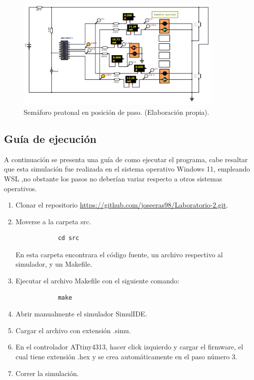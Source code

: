 \documentclass[12pt,letterpaper]{article}     %
\begin{document}
\begin{figure}[H]
    \centering
    \includegraphics[width=0.9\textwidth]{imagenes/paso peatones.jpeg}
    \caption{Semáforo peatonal en posición de paso. (Elaboración propia).}
    \label{F:peatones}
\end{figure}

\subsection{Guía de ejecución}
A continuación se presenta una guía de como ejecutar el programa, cabe resaltar que esta simulación fue realizada en el sistema operativo Windows 11, empleando WSL ,no obstante los pasos no deberían variar respecto a otros sistemas operativos.
\begin{enumerate}
    \item Clonar el repositorio \url{https://github.com/joseeras98/Laboratorio-2.git}.
    \item Moverse a la carpeta src.
        \begin{verbatim}
            cd src
        \end{verbatim}
        En esta carpeta encontrara el código fuente, un archivo respectivo al simulador, y un Makefile.
    \item Ejecutar el archivo Makefile con el siguiente comando:
        \begin{verbatim}
            make
        \end{verbatim}
    \item Abrir manualmente el simulador SimulIDE.
    \item Cargar el archivo con extensión .simu.
    \item En el controlador ATtiny4313, hacer click izquierdo y cargar el firmware, el cual tiene extensión .hex y se crea automáticamente en el paso número 3.
    \item Correr la simulación.
\end{enumerate}
\end{document}
